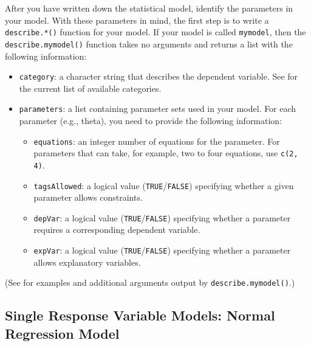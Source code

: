 After you have written down the statistical model, identify the
parameters in your model.  With these parameters in mind, the first
step is to write a {\tt describe.*()} function for your model.  If
your model is called {\tt mymodel}, then the {\tt describe.mymodel()}
function takes no arguments and returns a list with the following
information:
\begin{itemize}
\item {\tt category}: a character string that describes the dependent
variable.  See  for the current list of available
categories.  
\item {\tt parameters}:  a list containing parameter sets used in your
model.  For each parameter (e.g., theta), you need to provide the
following information:  

\begin{itemize}

\item {\tt equations}: an integer number of equations for the
parameter.  For parameters that can take, for example, two to four
equations, use {\tt c(2, 4)}.  

\item {\tt tagsAllowed}: a logical value ({\tt TRUE}/{\tt FALSE})
specifying whether a given parameter allows constraints.  

\item {\tt depVar}: a logical value ({\tt TRUE}/{\tt FALSE})
specifying whether a parameter requires a corresponding dependent
variable.  

\item {\tt expVar}: a logical value ({\tt TRUE}/{\tt FALSE})
specifying whether a parameter allows explanatory variables.  

\end{itemize}
\end{itemize}
(See  for examples and additional arguments
output by {\tt describe.mymodel()}.)

\subsection{Single Response Variable Models: Normal Regression Model}
\label{normal.regression}

